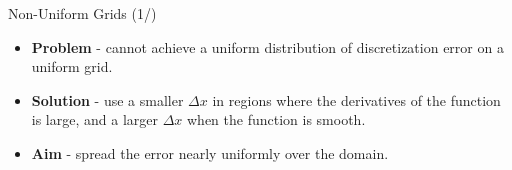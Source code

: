
\begin{frame}{Non-Uniform Grids (1/)}
\begin{itemize}
    \item \textbf{Problem} - cannot achieve a uniform distribution of discretization error on a uniform grid.
    \item \textbf{Solution} - use a smaller $\Delta x$ in regions where the derivatives of the function is large, and a larger $\Delta x$ when the function is smooth.
    \item \textbf{Aim} - spread the error nearly uniformly over the domain.
\end{itemize} 
\end{frame}


